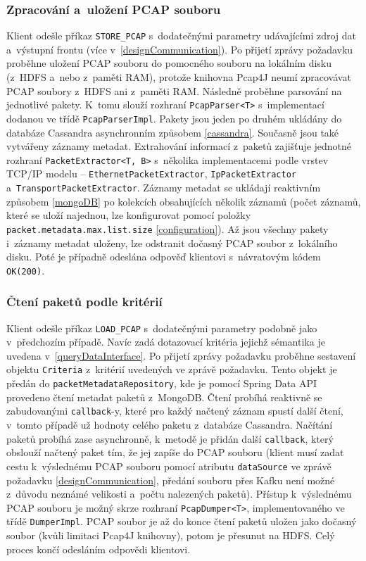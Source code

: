 \subsubsection{Zpracování a~uložení PCAP souboru}
Klient odešle příkaz \texttt{STORE\_PCAP} s~dodatečnými parametry udávajícími zdroj dat a~výstupní frontu (více v~\ref{designCommunication}). Po přijetí zprávy požadavku proběhne uložení PCAP souboru do pomocného souboru na lokálním disku (z~HDFS a~nebo z~paměti RAM), protože knihovna Pcap4J neumí zpracovávat PCAP soubory z~HDFS ani z~paměti RAM. Následně proběhne parsování na jednotlivé pakety. K~tomu slouží rozhraní \texttt{PcapParser<T>} s~implementací dodanou ve třídě \texttt{PcapParserImpl}. Pakety jsou jeden po druhém ukládány do databáze Cassandra asynchronním způsobem \ref{cassandra}. Současně jsou také vytvářeny záznamy metadat. Extrahování informací z~paketů zajišťuje jednotné rozhraní \texttt{PacketExtractor<T, B>} s~několika implementacemi podle vrstev TCP/IP modelu -- \texttt{EthernetPacketExtractor}, \texttt{IpPacketExtractor} a~\texttt{TransportPacketExtractor}. Záznamy metadat se ukládají reaktivním způsobem \ref{mongoDB} po kolekcích obsahujících několik záznamů (počet záznamů, které se uloží najednou, lze konfigurovat pomocí položky \texttt{packet.metadata.max.list.size} \ref{configuration}). Až jsou všechny pakety i~záznamy metadat uloženy, lze odstranit dočasný PCAP soubor z~lokálního disku. Poté je případně odeslána odpověď klientovi s~návratovým kódem \texttt{OK(200)}.

\subsubsection{Čtení paketů podle kritérií}
Klient odešle příkaz \texttt{LOAD\_PCAP} s~dodatečnými parametry podobně jako v~předchozím případě. Navíc zadá dotazovací kritéria jejichž sémantika je uvedena v~\ref{queryDataInterface}. Po přijetí zprávy požadavku proběhne sestavení objektu \texttt{Criteria} z~kritérií uvedených ve zprávě požadavku. Tento objekt je předán do \texttt{packetMetadataRepository}, kde je pomocí Spring Data API provedeno čtení metadat paketů z~MongoDB. Čtení probíhá reaktivně se zabudovanými \texttt{callback}-y, které pro každý načtený záznam spustí další čtení, v~tomto případě už hodnoty celého paketu z~databáze Cassandra. Načítání paketů probíhá zase asynchronně, k~metodě je přidán další \texttt{callback}, který obslouží načtený paket tím, že jej zapíše do PCAP souboru (klient musí zadat cestu k~výslednému PCAP souboru pomocí atributu \texttt{dataSource} ve zprávě požadavku \ref{designCommunication}, předání souboru přes Kafku není možné z~důvodu neznámé velikosti a~počtu nalezených paketů). Přístup k~výslednému PCAP souboru je možný skrze rozhraní \texttt{PcapDumper<T>}, implementovaného ve třídě \texttt{DumperImpl}. PCAP soubor je až do konce čtení paketů uložen jako dočasný soubor (kvůli limitaci Pcap4J knihovny), potom je přesunut na HDFS. Celý proces končí odesláním odpovědi klientovi.

